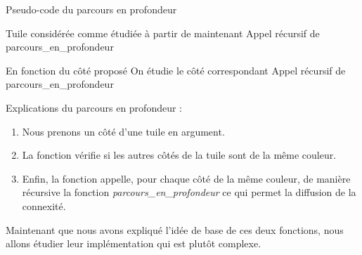 \documentclass[a4paper]{article}
\begin{document}
\begin{algorithm}
    \caption{Pseudo-code du parcours en profondeur}
    \begin{algorithmic}
            \STATE Tuile considérée comme étudiée à partir de maintenant
        \ENDIF 
            \STATE Appel récursif de parcours\_en\_profondeur
        \ENDFOR
        
        \STATE En fonction du côté proposé
        \STATE On étudie le côté correspondant
                \STATE Appel récursif de parcours\_en\_profondeur
            \ENDIF
        \ENDIF
    \end{algorithmic}
\end{algorithm}

Explications du parcours en profondeur : \\
\begin{enumerate}
\item Nous prenons un côté d'une tuile en argument.
\item La fonction vérifie si les autres côtés de la tuile sont de la même couleur.
\item Enfin, la fonction appelle, pour chaque côté de la même couleur, de manière récursive la fonction \emph{parcours\_en\_profondeur} ce qui permet la diffusion de la connexité. 
\end{enumerate}

Maintenant que nous avons expliqué l'idée de base de ces deux fonctions, nous allons étudier leur implémentation qui est plutôt complexe.
\end{document}
